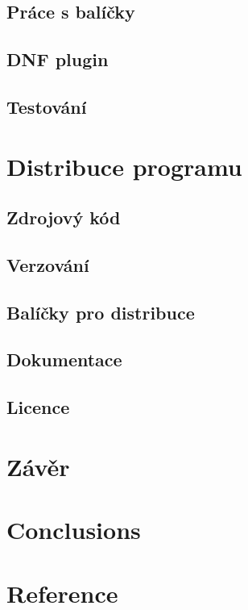 \documentclass[10pt,a4paper]{article}
\begin{document}
		\subsection{Práce s balíčky}
		\subsection{DNF plugin}
		\subsection{Testování}

	\section{Distribuce programu}
		\subsection{Zdrojový kód}
		\subsection{Verzování}
		\subsection{Balíčky pro distribuce}
		\subsection{Dokumentace}
		\subsection{Licence}

	\section{Závěr} %
	\section{Conclusions} %
	\section{Reference} %

\end{document}
